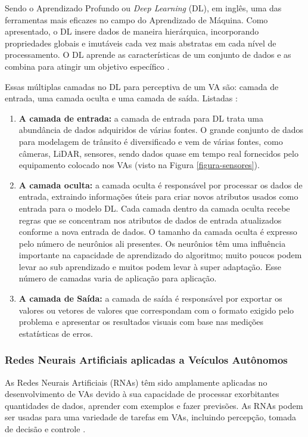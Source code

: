 Sendo o Aprendizado Profundo ou \textit{Deep Learning} (DL), em inglês, uma das ferramentas mais eficazes no campo do Aprendizado de Máquina. Como apresentado, o DL insere dados de maneira hierárquica, incorporando propriedades globais e imutáveis cada vez mais abstratas em cada nível de processamento. O DL aprende as características de um conjunto de dados e as combina para atingir um objetivo específico \cite{software-cnn}.

Essas múltiplas camadas no DL para perceptiva de um VA são: camada de entrada, uma camada oculta e uma camada de saída. Listadas \cite{software-ia}:

\begin{enumerate}
\item \textbf{A camada de entrada:} a camada de entrada para DL trata uma abundância de dados adquiridos de várias fontes. O grande conjunto de dados para modelagem de trânsito é diversificado e vem de várias fontes, como câmeras, LiDAR, sensores, sendo dados quase em tempo real fornecidos pelo equipamento colocado nos VAs (visto na Figura \ref{figura-sensores}).
\item \textbf{A camada oculta:} a camada oculta é responsável por processar os dados de entrada, extraindo informações úteis para criar novos atributos usados como entrada para o modelo DL. Cada camada dentro da camada oculta recebe regras que se concentram nos atributos de dados de entrada atualizados conforme a nova entrada de dados. O tamanho da camada oculta é expresso pelo número de neurônios ali presentes. Os neurônios têm uma influência importante na capacidade de aprendizado do algoritmo; muito poucos podem levar ao sub aprendizado e muitos podem levar à super adaptação. Esse número de camadas varia de aplicação para aplicação.
\item \textbf{A camada de Saída:} a camada de saída é responsável por exportar os valores ou vetores de valores que correspondam com o formato exigido pelo problema e apresentar os resultados visuais com base nas medições estatísticas de erros.
\end{enumerate}

\subsubsection{Redes Neurais Artificiais aplicadas a Veículos Autônomos}

As Redes Neurais Artificiais (RNAs) têm sido amplamente aplicadas no desenvolvimento de VAs devido à sua capacidade de processar exorbitantes quantidades de dados, aprender com exemplos e fazer previsões. As RNAs podem ser usadas para uma variedade de tarefas em VAs, incluindo percepção, tomada de decisão e controle \cite{sensors-yet}. 

